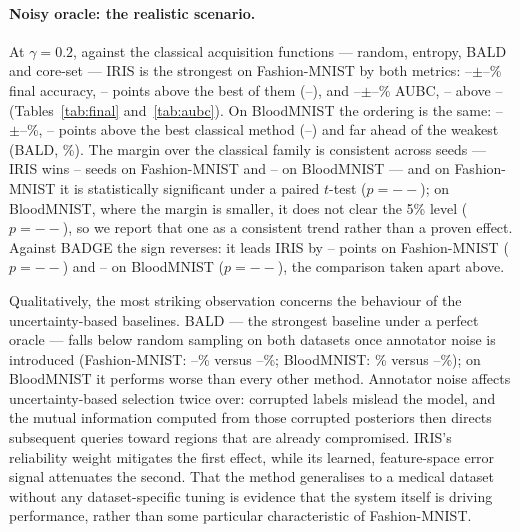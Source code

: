 \documentclass[a4paper,fleqn,longmktitle]{cas-sc}
\newcommand{\method}{IRIS}
\providecommand{\FmnistNoisyIrisAubc}{--}\providecommand{\FmnistNoisyIrisAubcStd}{--}
\providecommand{\FmnistNoisyIrisFinal}{--}\providecommand{\FmnistNoisyIrisFinalStd}{--}
\providecommand{\FmnistNoisyBaldFinal}{--}\providecommand{\FmnistNoisyBaldAubc}{--}
\providecommand{\FmnistNoisyRandomFinal}{--}\providecommand{\FmnistNoisyRandomAubc}{--}
\providecommand{\BloodNoisyIrisFinal}{--}\providecommand{\BloodNoisyIrisFinalStd}{--}
\providecommand{\BloodNoisyRandomFinal}{--}\providecommand{\BloodNoisyRandomAubc}{--}
\providecommand{\FmnistNoisyBestClassicFinalName}{--}\providecommand{\FmnistNoisyBestClassicName}{--}\providecommand{\FmnistNoisyIrisClassicFinalGain}{--}\providecommand{\FmnistNoisyIrisClassicAubcGain}{--}\providecommand{\FmnistNoisyIrisClassicPairedP}{--}\providecommand{\FmnistNoisyIrisClassicSeedsWon}{--}\providecommand{\FmnistNoisyBadgeOverIrisFinal}{--}\providecommand{\FmnistNoisyBadgeOverIrisAubc}{--}\providecommand{\FmnistNoisyIrisBadgePairedP}{--}\providecommand{\FmnistNoisyIrisBadgeSeedsWon}{--}\providecommand{\FmnistCleanBestClassicFinalName}{--}\providecommand{\FmnistCleanBestClassicName}{--}\providecommand{\FmnistCleanIrisClassicFinalGain}{--}\providecommand{\FmnistCleanIrisClassicAubcGain}{--}\providecommand{\FmnistCleanIrisClassicPairedP}{--}\providecommand{\FmnistCleanIrisClassicSeedsWon}{--}\providecommand{\FmnistCleanBadgeOverIrisFinal}{--}\providecommand{\FmnistCleanBadgeOverIrisAubc}{--}\providecommand{\FmnistCleanIrisBadgePairedP}{--}\providecommand{\FmnistCleanIrisBadgeSeedsWon}{--}\providecommand{\BloodNoisyBestClassicFinalName}{--}\providecommand{\BloodNoisyBestClassicName}{--}\providecommand{\BloodNoisyIrisClassicFinalGain}{--}\providecommand{\BloodNoisyIrisClassicAubcGain}{--}\providecommand{\BloodNoisyIrisClassicPairedP}{--}\providecommand{\BloodNoisyIrisClassicSeedsWon}{--}\providecommand{\BloodNoisyBadgeOverIrisFinal}{--}\providecommand{\BloodNoisyBadgeOverIrisAubc}{--}\providecommand{\BloodNoisyIrisBadgePairedP}{--}\providecommand{\BloodNoisyIrisBadgeSeedsWon}{--}\providecommand{\BloodCleanBestClassicFinalName}{--}\providecommand{\BloodCleanBestClassicName}{--}\providecommand{\BloodCleanIrisClassicFinalGain}{--}\providecommand{\BloodCleanIrisClassicAubcGain}{--}\providecommand{\BloodCleanIrisClassicPairedP}{--}\providecommand{\BloodCleanIrisClassicSeedsWon}{--}\providecommand{\BloodCleanBadgeOverIrisFinal}{--}\providecommand{\BloodCleanBadgeOverIrisAubc}{--}\providecommand{\BloodCleanIrisBadgePairedP}{--}\providecommand{\BloodCleanIrisBadgeSeedsWon}{--}\providecommand{\CifarNoisyBestClassicFinalName}{--}\providecommand{\CifarNoisyBestClassicName}{--}\providecommand{\CifarNoisyIrisClassicFinalGain}{--}\providecommand{\CifarNoisyIrisClassicAubcGain}{--}\providecommand{\CifarNoisyIrisClassicPairedP}{--}\providecommand{\CifarNoisyIrisClassicSeedsWon}{--}\providecommand{\CifarNoisyBadgeOverIrisFinal}{--}\providecommand{\CifarNoisyBadgeOverIrisAubc}{--}\providecommand{\CifarNoisyIrisBadgePairedP}{--}\providecommand{\CifarNoisyIrisBadgeSeedsWon}{--}\providecommand{\CifarCleanBestClassicFinalName}{--}\providecommand{\CifarCleanBestClassicName}{--}\providecommand{\CifarCleanIrisClassicFinalGain}{--}\providecommand{\CifarCleanIrisClassicAubcGain}{--}\providecommand{\CifarCleanIrisClassicPairedP}{--}\providecommand{\CifarCleanIrisClassicSeedsWon}{--}\providecommand{\CifarCleanBadgeOverIrisFinal}{--}\providecommand{\CifarCleanBadgeOverIrisAubc}{--}\providecommand{\CifarCleanIrisBadgePairedP}{--}\providecommand{\CifarCleanIrisBadgeSeedsWon}{--}
\begin{document}
\paragraph{Noisy oracle: the realistic scenario.} At $\gamma=0.2$,
against the classical acquisition functions --- random, entropy, BALD
and core-set --- \method{} is the strongest on Fashion-MNIST by both
metrics: \FmnistNoisyIrisFinal$\pm$\FmnistNoisyIrisFinalStd\% final
accuracy, \FmnistNoisyIrisClassicFinalGain{} points above the best of
them (\FmnistNoisyBestClassicFinalName), and
\FmnistNoisyIrisAubc$\pm$\FmnistNoisyIrisAubcStd\% AUBC,
\FmnistNoisyIrisClassicAubcGain{} above \FmnistNoisyBestClassicName{}
(Tables~\ref{tab:final} and~\ref{tab:aubc}). On BloodMNIST the
ordering is the same: \BloodNoisyIrisFinal$\pm$\BloodNoisyIrisFinalStd\%,
\BloodNoisyIrisClassicFinalGain{} points above the best classical
method (\BloodNoisyBestClassicFinalName) and far ahead of the weakest
(BALD, \BloodNoisyBaldFinal\%). The margin over the classical family is
consistent across seeds --- \method{} wins
\FmnistNoisyIrisClassicSeedsWon{} seeds on Fashion-MNIST and
\BloodNoisyIrisClassicSeedsWon{} on BloodMNIST --- and on Fashion-MNIST
it is statistically significant under a paired $t$-test
($p=\FmnistNoisyIrisClassicPairedP$); on BloodMNIST, where the margin is
smaller, it does not clear the 5\% level
($p=\BloodNoisyIrisClassicPairedP$), so we report that one as a
consistent trend rather than a proven effect. Against BADGE the sign
reverses: it leads \method{} by \FmnistNoisyBadgeOverIrisFinal{} points
on Fashion-MNIST ($p=\FmnistNoisyIrisBadgePairedP$) and
\BloodNoisyBadgeOverIrisFinal{} on BloodMNIST
($p=\BloodNoisyIrisBadgePairedP$), the comparison taken apart above.

Qualitatively, the most striking observation concerns the behaviour of
the uncertainty-based baselines. BALD --- the strongest baseline under
a perfect oracle --- falls below random sampling on both datasets once
annotator noise is introduced (Fashion-MNIST: \FmnistNoisyBaldFinal\%
versus \FmnistNoisyRandomFinal\%; BloodMNIST: \BloodNoisyBaldFinal\%
versus \BloodNoisyRandomFinal\%); on BloodMNIST it performs worse than
every other method. Annotator noise affects uncertainty-based selection
twice over: corrupted labels mislead the model, and the mutual
information computed from those corrupted posteriors then directs
subsequent queries toward regions that are already compromised.
\method{}'s reliability weight mitigates the first effect, while its
learned, feature-space error signal attenuates the second. That the
method generalises to a medical dataset without any dataset-specific
tuning is evidence that the system itself is driving performance,
rather than some particular characteristic of Fashion-MNIST.
\end{document}
